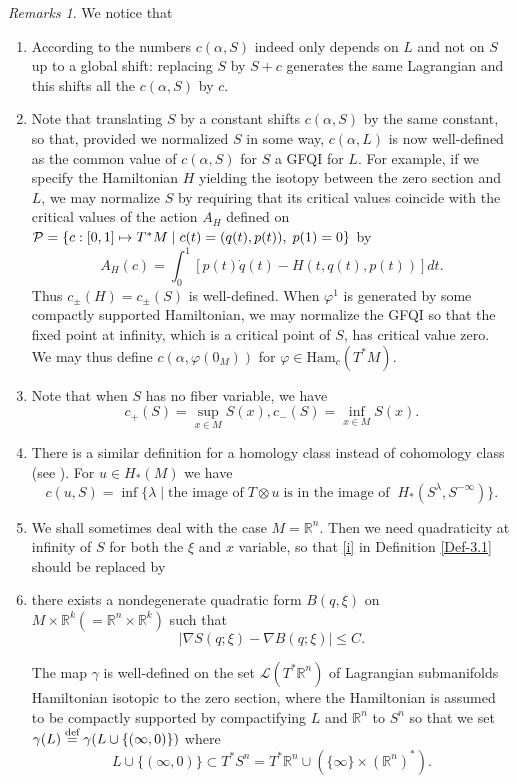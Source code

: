 \documentclass[JEP,XML,SOM,NoFloatCountersInSection,Unicode,published]{cedram}
\newcommand\mto{\mathchoice{\longmapsto}{\mapsto}{\mapsto}{\mapsto}}
\numberwithin{equation}{section}
\newcommand {\DHam}{\mathrm{Ham}}
\newcommand{\GFQI}{\textup{GFQI}\xspace}
\let \phi \varphi
\theoremstyle{plain}
\theoremstyle{definition}
\theoremstyle{remark}
\newtheorem{remarks}[theorem]{Remarks}
\begin{document}
\begin{remarks}\label{rem-3.4}
We notice that
\begin{enumerate}
\item According to \cite{Viterbo-STAGGF, Theret} the numbers $c(\alpha,S)$ indeed only depends on $L$ and not on $S$ up to a global shift: replacing $S$ by $S+c$ generates the same Lagrangian and this shifts all the $c(\alpha,S)$ by $c$.
\item \label{rem-3.4-1} Note that translating $S$ by a constant shifts
$c(\alpha, S)$ by the same constant, so that, provided we
normalized $S$ in some way, $c(\alpha, L)$ is now well-defined as the common value of $c(\alpha, S)$ for $S$ a \GFQI for $L$. For example, if we specify the Hamiltonian $H$ yielding the isotopy between
the zero section and $L$, we may normalize $S$ by requiring that its critical values coincide with the critical values of the
action $A_{H}$ defined on ${\mathcal P}=\{ c: [0,1] \mto T^{*}M \mid c(t)=(q(t),p(t)), \;p(1)=0\}$ by
\[
A_{H}(c)=\int_{0}^{1} \left [ p(t)\dot q(t) -H(t,q(t),p(t))\right ] dt.
\]
Thus $c_{\pm}(H)=c_\pm(S)$ is well-defined. When $\phi^{1}$ is generated by some compactly supported Hamiltonian, we may normalize the \GFQI so that the fixed point at infinity, which is a critical point of $S$, has critical value zero. We may thus define $c (\alpha, \phi(0_M))$ for $\phi \in {\DHam}_{c}(T^*M)$.
\item \label{rem-trivial-c} Note that when $S$ has no fiber variable, we have
\[
c_+(S)=\sup_{x\in M} S(x), c_-(S)=\inf_{x\in M} S(x).
\]

\item \label{rem-homology-level} There is a similar definition for a homology class instead of cohomology class (see \cite[p.\,692]{Viterbo-STAGGF}). For $u \in H_*(M)$ we have
\[
c(u, S)= \inf\{\lambda \mid \text{the image of}\; T\otimes u\; \text{is in the image of}\;\; H_{*}(S^{\lambda}, S^{-\infty}) \}.
\]
\item We shall sometimes deal with the case $M=\mathbb{R}^{n}$. Then we
need quadraticity at infinity of $S$ for both the $\xi$ and $x$ variable, so that \eqref{i} in Definition \ref{Def-3.1} should be replaced by
\item [(1')] there exists a nondegenerate quadratic form $B(q,\xi)$ on $M \times
\mathbb{R}^{k} (= \mathbb{R}^{n}\times \mathbb{R}^{k})$ such that
\[
\vert \nabla S (q;\xi) - \nabla B (q;\xi) \vert \leq C.
\]

The map $\gamma$ is well-defined on the set $\mathcal{L}(T^{*} {\mathbb R} ^{n})$ of
Lagrangian submanifolds Hamiltonian isotopic to the zero section, where the Hamiltonian is assumed to be compactly supported by compactifying $L$ and $ {\mathbb R}^n$ to $S^n$ so that we set $\gamma (L)\overset{\textup{def}}=\gamma(L\cup \{(\infty,0)\})$ where
\[
L\cup \{(\infty,0)\} \subset T^*S^n=T^* {\mathbb R}^n \cup (\{\infty\} \times ({\mathbb R}^n)^*).
\]
\end{enumerate}
\end{remarks}
\end{document}
